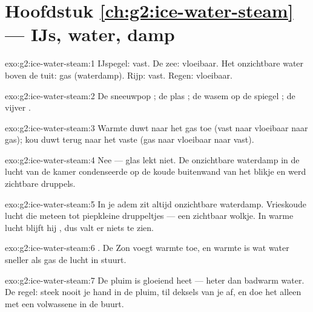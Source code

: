 \section*{Hoofdstuk \ref{ch:g2:ice-water-steam} --- IJs, water, damp}

\begin{solution}{exo:g2:ice-water-steam:1}
IJspegel: vast. De zee: vloeibaar. Het onzichtbare water boven de
tuit: gas (waterdamp). Rijp: vast. Regen: vloeibaar.
\end{solution}

\begin{solution}{exo:g2:ice-water-steam:2}
De sneeuwpop ; de plas ; de wasem op de spiegel
; de vijver .
\end{solution}

\begin{solution}{exo:g2:ice-water-steam:3}
Warmte duwt naar het gas toe (vast naar vloeibaar naar gas); kou duwt
terug naar het vaste (gas naar vloeibaar naar vast).
\end{solution}

\begin{solution}{exo:g2:ice-water-steam:4}
Nee --- glas lekt niet. De onzichtbare waterdamp in de lucht van de
kamer condenseerde op de koude buitenwand van het blikje en werd
zichtbare druppels.
\end{solution}

\begin{solution}{exo:g2:ice-water-steam:5}
In je adem zit altijd onzichtbare waterdamp. Vrieskoude lucht
 die meteen tot piepkleine druppeltjes --- een zichtbaar
wolkje. In warme lucht blijft hij , dus valt er niets te
zien.
\end{solution}

\begin{solution}{exo:g2:ice-water-steam:6}
. De Zon voegt warmte toe, en warmte is wat water sneller
als gas de lucht in stuurt.
\end{solution}

\begin{solution}{exo:g2:ice-water-steam:7}
De pluim is gloeiend heet --- heter dan badwarm water. De regel: steek
nooit je hand in de pluim, til deksels van je af, en doe het alleen
met een volwassene in de buurt.
\end{solution}

